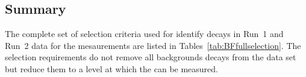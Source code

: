 \subsection{Summary}
\label{sec:BFsummary}
The complete set of selection criteria used for identify \bmumu decays in Run~1 and Run~2 data for the \BF mesaurements are listed in Tables~\ref{tab:BFfullselection}. %
The selection requirements do not remove all backgrounds decays from the data set but reduce them to a level at which the \BFs can be measured. %
